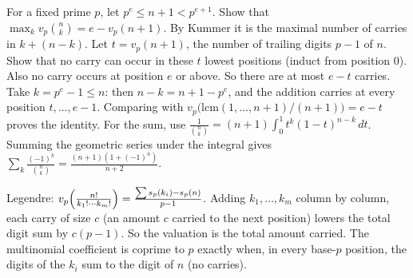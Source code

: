 \documentclass[11pt,a4paper]{article}
\begin{document}
 For a fixed prime $p$, let $p^e\le n+1<p^{e+1}$. Show that $\max_kv_p\binom nk=e-v_p(n+1)$. By Kummer it is the maximal number of carries in $k+(n-k)$.
 Let $t=v_p(n+1)$, the number of trailing digits $p-1$ of $n$. Show that no carry can occur in these $t$ lowest positions (induct from position $0$). Also no carry occurs at position $e$ or above. So there are at most $e-t$ carries. Take $k=p^e-1\le n$: then $n-k=n+1-p^e$, and the addition carries at every position $t,\dots,e-1$. Comparing with $v_p\bigl(\mathrm{lcm}(1,\dots,n+1)/(n+1)\bigr)=e-t$ proves the identity.
 For the sum, use $\frac1{\binom nk}=(n+1)\int_0^1t^k(1-t)^{n-k}\,dt$. Summing the geometric series under the integral gives $\sum_k\frac{(-1)^k}{\binom nk}=\frac{(n+1)(1+(-1)^n)}{n+2}$.

 Legendre: $v_p\Bigl(\frac{n!}{k_1!\cdots k_m!}\Bigr)=\frac{\sum s_p(k_i)-s_p(n)}{p-1}$.
 Adding $k_1,\dots,k_m$ column by column, each carry of size $c$ (an amount $c$ carried to the next position) lowers the total digit sum by $c(p-1)$. So the valuation is the total amount carried.
 The multinomial coefficient is coprime to $p$ exactly when, in every base-$p$ position, the digits of the $k_i$ sum to the digit of $n$ (no carries).
\end{document}
